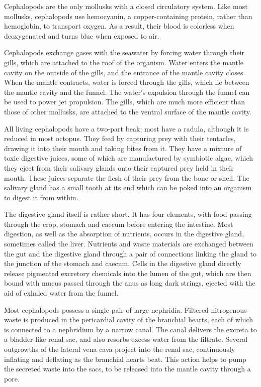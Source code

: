 \documentclass[]{book}
\theoremstyle{definition}
\theoremstyle{definition}
\theoremstyle{definition}
\theoremstyle{remark}
\begin{document}
Cephalopods are the only mollusks with a closed circulatory system. Like
most mollusks, cephalopods use hemocyanin, a copper-containing protein,
rather than hemoglobin, to transport oxygen. As a result, their blood is
colorless when deoxygenated and turns blue when exposed to air.

Cephalopods exchange gases with the seawater by forcing water through
their gills, which are attached to the roof of the organism. Water
enters the mantle cavity on the outside of the gills, and the entrance
of the mantle cavity closes. When the mantle contracts, water is forced
through the gills, which lie between the mantle cavity and the funnel.
The water's expulsion through the funnel can be used to power jet
propulsion. The gills, which are much more efficient than those of other
mollusks, are attached to the ventral surface of the mantle cavity.

All living cephalopods have a two-part beak; most have a radula,
although it is reduced in most octopus. They feed by capturing prey with
their tentacles, drawing it into their mouth and taking bites from it.
They have a mixture of toxic digestive juices, some of which are
manufactured by symbiotic algae, which they eject from their salivary
glands onto their captured prey held in their mouth. These juices
separate the flesh of their prey from the bone or shell. The salivary
gland has a small tooth at its end which can be poked into an organism
to digest it from within.

The digestive gland itself is rather short. It has four elements, with
food passing through the crop, stomach and caecum before entering the
intestine. Most digestion, as well as the absorption of nutrients,
occurs in the digestive gland, sometimes called the liver. Nutrients and
waste materials are exchanged between the gut and the digestive gland
through a pair of connections linking the gland to the junction of the
stomach and caecum. Cells in the digestive gland directly release
pigmented excretory chemicals into the lumen of the gut, which are then
bound with mucus passed through the anus as long dark strings, ejected
with the aid of exhaled water from the funnel.

Most cephalopods possess a single pair of large nephridia. Filtered
nitrogenous waste is produced in the pericardial cavity of the branchial
hearts, each of which is connected to a nephridium by a narrow canal.
The canal delivers the excreta to a bladder-like renal sac, and also
resorbs excess water from the filtrate. Several outgrowths of the
lateral vena cava project into the renal sac, continuously inflating and
deflating as the branchial hearts beat. This action helps to pump the
secreted waste into the sacs, to be released into the mantle cavity
through a pore.
\end{document}
